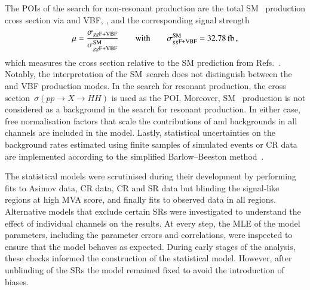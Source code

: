 The POIs of the search for non-resonant \HH production are the total SM~\HH
production cross section via \ggF and VBF, \xsecggfvbf, and the corresponding
signal strength
\begin{align*}
  \mu = \frac{\xsecggfvbf}{\xsecggfvbf^{\text{SM}}}
  \qquad \text{with} \qquad
  \xsecggfvbf^{\text{SM}} = \SI{32.78}{\femto\barn}
  \,\text{,}
\end{align*}
which measures the cross section relative to the SM prediction from
Refs.~\cite{Grazzini:2018bsd,Dreyer:2018qbw}. Notably, the interpretation of the
SM~\HH search does not distinguish between the \ggF and VBF production modes.
In the search for resonant \HH production, the cross
section~$\sigma(pp \to X \to HH)$ is used as the POI. Moreover, SM~\HH
production is not considered as a background in the search for resonant \HH
production. In either case, free normalisation factors that scale the
contributions of \ZHF and \ttbar backgrounds in all channels are included in the
model. Lastly, statistical uncertainties on the background rates estimated using
finite samples of simulated events or CR data are implemented according to the
simplified Barlow--Beeston method~\cite{barlow1993,conway2011}.




The statistical models were scrutinised during their development by performing
fits to Asimov data, CR data, CR and SR data but blinding the signal-like
regions at high MVA score, and finally fits to observed data in all
regions. Alternative models that exclude certain SRs were investigated to
understand the effect of individual channels on the results. At every step, the
MLE of the model parameters, including the parameter errors and correlations,
were inspected to ensure that the model behaves as expected. During early stages
of the analysis, these checks informed the construction of the statistical
model. However, after unblinding of the SRs the model remained fixed to avoid
the introduction of biases.


